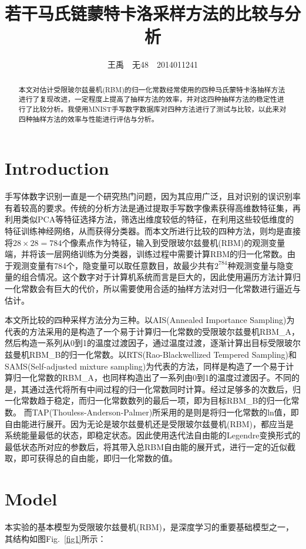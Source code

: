 \documentclass[journal,a4paper]{IEEEtran}
\title{\huge{若干马氏链蒙特卡洛采样方法的比较与分析}}
\author{王禹~~无48~~2014011241}
\begin{document}
	\maketitle
	\begin{abstract}

		本文对估计受限玻尔兹曼机(RBM)的归一化常数经常使用的四种马氏蒙特卡洛抽样方法进行了复现改进，一定程度上提高了抽样方法的效率，并对这四种抽样方法的稳定性进行了比较分析。我使用MNIST手写数字数据库对四种方法进行了测试与比较，以此来对四种抽样方法的效率与性能进行评估与分析。

	\end{abstract}


	\section{Introduction}
	 手写体数字识别一直是一个研究热门问题，因为其应用广泛，且对识别的误识别率有着较高的要求。传统的分析方法是通过提取手写数字像素获得高维数特征集，再利用类似PCA等特征选择方法，筛选出维度较低的特征，在利用这些较低维度的特征训练神经网络，从而获得分类器。而本文所进行比较的四种方法，则均是直接将$ 28 \times 28 = 784$个像素点作为特征，输入到受限玻尔兹曼机(RBM)的观测变量端，并将该一层网络训练为分类器，训练过程中需要计算RBM的归一化常数。由于观测变量有784个，隐变量可以取任意数目，故最少共有$ 2^784 $种观测变量与隐变量的组合情况。这个数字对于计算机系统而言是巨大的，因此使用遍历方法计算归一化常数会有巨大的代价，所以需要使用合适的抽样方法对归一化常数进行逼近与估计。

	 本文所比较的四种采样方法分为三种。以AIS(Annealed Importance Sampling)\cite{salakhutdinov2009learning}为代表的方法采用的是构造了一个易于计算归一化常数的受限玻尔兹曼机RBM\_A，然后构造一系列从0到1的温度过渡因子，通过温度过渡，逐渐计算出目标受限玻尔兹曼机RBM\_B的归一化常数。以RTS(Rao-Blackwellized Tempered Sampling)\cite{carlson2016partition}和SAMS(Self-adjusted mixture sampling)\cite{tan2015optimally}为代表的方法，同样是构造了一个易于计算归一化常数的RBM\_A，也同样构造出了一系列由0到1的温度过渡因子。不同的是，其通过迭代将所有中间过程的归一化常数同时计算。经过足够多的次数后，归一化常数趋于稳定，而归一化常数数列的最后一项，即为目标RBM\_B的归一化常数。	而TAP(Thouless-Anderson-Palmer)\cite{gabrie2015training}所采用的是则是将归一化常数的ln值，即自由能进行展开。因为无论是玻尔兹曼机还是受限玻尔兹曼机(RBM)，都应当是系统能量最低的状态，即稳定状态。因此使用迭代法自由能的Legendre变换形式的最低状态所对应的参数后，将其带入总RBM自由能的展开式，进行一定的近似截取，即可获得总的自由能，即归一化常数的值。
	\section{Model}
	本实验的基本模型为受限玻尔兹曼机(RBM)，是深度学习的重要基础模型之一，其结构如图Fig.~\ref{fig1}所示：
\end{document}
